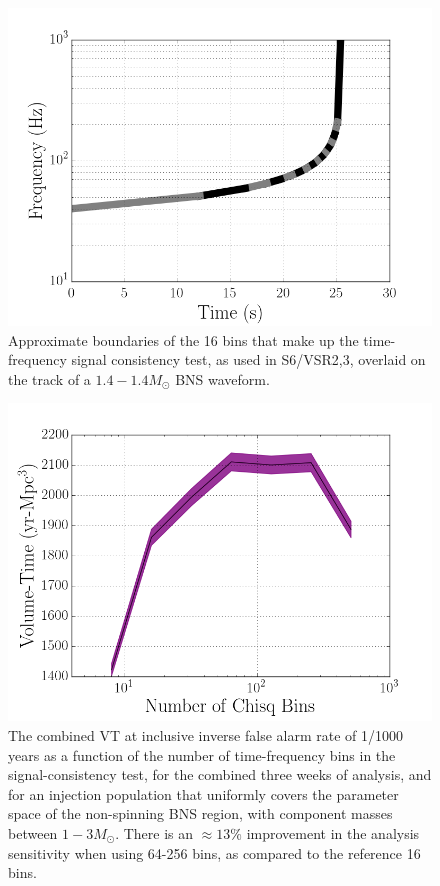 \begin{figure}
\centering
\includegraphics[width=1.0\textwidth]{papers/bns_o1_dev/figures/bin.png}
\caption{\label{fig:chisqbins} 
Approximate boundaries of the 16 bins that make up the time-frequency signal consistency test, as used in S6/VSR2,3, overlaid on the track of a $1.4-1.4M_{\odot}$ BNS waveform. 
}
\end{figure}

\begin{figure}
\centering
\includegraphics[width=1.0\textwidth]{papers/bns_o1_dev/figures/cb.png}
\caption{\label{fig:vbin} 
The combined VT at inclusive inverse false alarm rate of 1/1000 years as a function of the number of time-frequency bins in the signal-consistency test, for the combined three weeks of analysis, and for an injection population that uniformly covers the parameter space of the non-spinning BNS region, with component masses between $1- 3M_\odot$. There is an $\approx 13\% $ improvement in the analysis sensitivity when using 64-256 bins, as compared to the reference 16 bins.
}
\end{figure}

